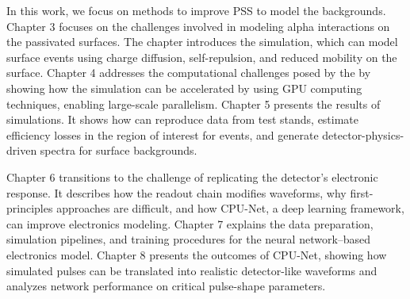 In this work, we focus on methods to improve PSS to model the backgrounds. Chapter 3 focuses on the challenges involved in modeling alpha interactions on the passivated surfaces. The chapter introduces the {\ehd} simulation, which can model surface events using charge diffusion, self-repulsion, and reduced mobility on the surface. Chapter 4 addresses the computational challenges posed by the {\ehd} by showing how the simulation can be accelerated by using GPU computing techniques, enabling large-scale parallelism. Chapter 5 presents the results of {\ehd} simulations. It shows how {\ehd} can reproduce data from test stands, estimate efficiency losses in the region of interest for {\onbb} events, and generate detector-physics-driven spectra for surface backgrounds.

Chapter 6 transitions to the challenge of replicating the detector’s electronic response. It describes how the readout chain modifies waveforms, why first-principles approaches are difficult, and how CPU-Net, a deep learning framework, can improve electronics modeling. Chapter 7 explains the data preparation, simulation pipelines, and training procedures for the neural network–based electronics model. Chapter 8 presents the outcomes of CPU-Net, showing how simulated pulses can be translated into realistic detector-like waveforms and analyzes network performance on critical pulse-shape parameters.
